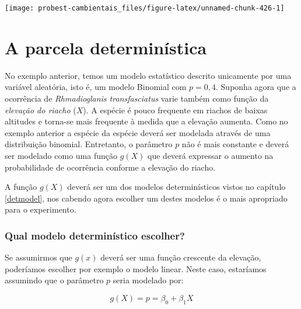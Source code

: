 \documentclass[
]{book}
\begin{document}
\begin{center}\texttt{[image: probest-cambientais\_files/figure-latex/unnamed-chunk-426-1]} \end{center}

\hypertarget{a-parcela-determinuxedstica}{%
\section{A parcela determinística}\label{a-parcela-determinuxedstica}}

No exemplo anterior, temos um modelo estatístico descrito unicamente por uma variável aleatória, isto é, um modelo Binomial com \(p = 0,4\). Suponha agora que a ocorrência de \emph{Rhmadioglanis transfasciatus} varie também como função da \emph{elevação do riacho} (\(X\)). A espécie é pouco frequente em riachos de baixas altitudes e torna-se mais frequente à medida que a elevação aumenta. Como no exemplo anterior a espécie da espécie deverá ser modelada através de uma distribuição binomial. Entretanto, o parâmetro \(p\) não é mais constante e deverá ser modelado como uma função \(g(X)\) que deverá expressar o aumento na probabilidade de ocorrência conforme a elevação do riacho.

A função \(g(X)\) deverá ser um dos modelos determinísticos vistos no capítulo \ref{detmodel}, nos cabendo agora escolher um destes modelos é o mais apropriado para o experimento.

\hypertarget{qual-modelo-determinuxedstico-escolher}{%
\subsubsection*{Qual modelo determinístico escolher?}\label{qual-modelo-determinuxedstico-escolher}}

Se assumirmos que \(g(x)\) deverá ser uma função crescente da elevação, poderíamos escolher por exemplo o modelo linear. Neste caso, estaríamos assumindo que o parâmetro \(p\) seria modelado por:

\[g(X) = p = \beta_0 + \beta_1 X\]
\end{document}
